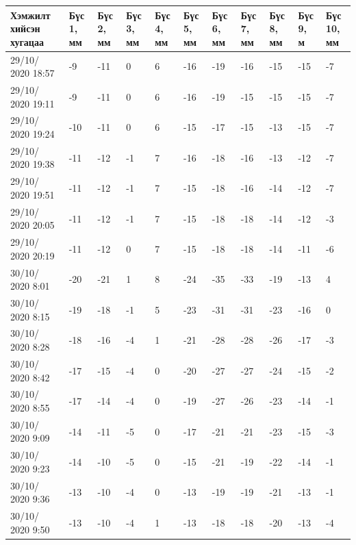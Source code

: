 \begin{table}[h]
    \centering
    \begin{tabular}{|p{1.5cm}|p{0.8cm}|p{0.8cm}|p{0.8cm}|p{0.8cm}|p{0.8cm}|p{0.8cm}|p{0.8cm}|p{0.8cm}|p{0.8cm}|p{0.8cm}|}
         \hline
     Хэмжилт хийсэн хугацаа & Бүс 1, мм&	Бүс 2, мм&	Бүс 3, мм&	Бүс 4, мм&	Бүс 5, мм&	Бүс 6, мм&	Бүс 7, мм&	Бүс 8, мм&	Бүс 9, м&	Бүс 10, мм\\ \hline
29/10/ 2020 18:57&	-9&	-11&	0&	6&	-16&	-19&	-16&	-15&	-15&	-7\\ \hline
29/10/ 2020 19:11&	-9&	-11&	0&	6&	-16&	-19&	-15&	-15&	-15&	-7\\ \hline
29/10/ 2020 19:24&	-10&	-11&	0&	6&	-15&	-17&	-15&	-13&	-15&	-7\\ \hline
29/10/ 2020 19:38&	-11&	-12&	-1&	7&	-16&	-18&	-16&	-13&	-12&	-7\\ \hline
29/10/ 2020 19:51&	-11&	-12&	-1&	7&	-15&	-18&	-16&	-14&	-12&	-7\\ \hline
29/10/ 2020 20:05&	-11&	-12&	-1&	7&	-15&	-18&	-18&	-14&	-12&	-3\\ \hline
29/10/ 2020 20:19&	-11&	-12&	0&	7&	-15&	-18&	-18&	-14&	-11&	-6\\ \hline
30/10/ 2020 8:01&	-20&	-21&	1&	8&	-24&	-35&	-33&	-19&	-13&	4\\ \hline
30/10/ 2020 8:15&	-19&	-18&	-1&	5&	-23&	-31&	-31&	-23&	-16&	0\\ \hline
30/10/ 2020 8:28&	-18&	-16&	-4&	1&	-21&	-28&	-28&	-26&	-17&	-3\\ \hline
30/10/ 2020 8:42&	-17&	-15&	-4&	0&	-20&	-27&	-27&	-24&	-15&	-2\\ \hline
30/10/ 2020 8:55&	-17&	-14&	-4&	0&	-19&	-27&	-26&	-23&	-14&	-1\\ \hline
30/10/ 2020 9:09&	-14&	-11&	-5&	0&	-17&	-21&	-21&	-23&	-15&	-3\\ \hline
30/10/ 2020 9:23&	-14&	-10&	-5&	0&	-15&	-21&	-19&	-22&	-14&	-1\\ \hline
30/10/ 2020 9:36&	-13&	-10&	-4&	0&	-13&	-19&	-19&	-21&	-13&	-1\\ \hline
30/10/ 2020 9:50&	-13&	-10&	-4&	1&	-13&	-18&	-18&	-20&	-13&	-4\\ \hline
    \end{tabular}
\end{table}
